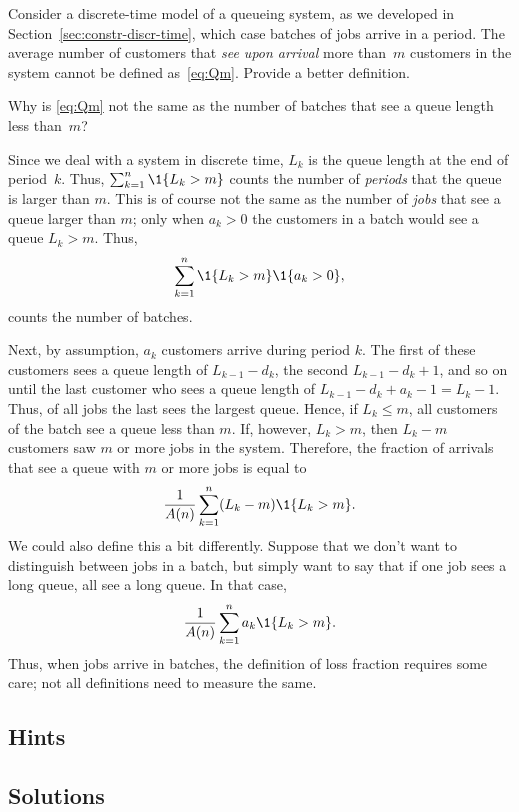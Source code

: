 \begin{exercise}
  Consider a discrete-time model of a queueing system, as we developed
  in Section~\ref{sec:constr-discr-time}, which case  batches of
  jobs arrive in a period.  The average number of customers
  that \emph{see upon arrival} more than~$m$ customers in the system
  cannot be defined as~\eqref{eq:Qm}. Provide a better definition. 
  \begin{hint}
Why is \eqref{eq:Qm} not the same as the number of
  batches that see a queue length less than~$m$?
  \end{hint}
  \begin{solution} Since we deal with a system in discrete time, $L_k$
    is the queue length at the end of period~$k$. Thus,
    $\sum_{k=1}^n \1{L_k > m}$ counts the number of \emph{periods}
    that the queue is larger than $m$. This is of course not the same
    as the number of \emph{jobs} that see a queue larger than $m$;
    only when $a_k>0$ the customers in a batch would see a queue
    $L_k>m$. Thus,
    \begin{equation*}
      \sum_{k=1}^n \1{L_k > m} \1{a_k > 0},
    \end{equation*}
    counts the number of batches. 

    Next, by assumption, $a_k$ customers arrive during period $k$. The
    first of these customers sees a queue length of $L_{k-1} - d_k$,
    the second $L_{k-1}-d_k + 1$, and so on until the last customer
    who sees a queue length of $L_{k-1} - d_k + a_k -1 = L_k
    -1$.
    Thus, of all jobs the last sees the largest queue. Hence, if
    $L_k \leq m$, all customers of the batch see a queue less than
    $m$. If, however, $L_k > m$, then $L_k -m$ customers saw $m$ or
    more jobs in the system. Therefore, the fraction of arrivals that
    see a queue with $m$ or more jobs is equal to
\begin{equation*}
  \frac 1 {A(n)} \sum_{k=1}^n (L_k - m) \1{L_k > m} .
\end{equation*}
We could also define this a bit differently. Suppose that we don't
want to distinguish between jobs in a batch, but simply want to say
that if one job sees a long queue, all see a long queue. In that case,
\begin{equation*}
\frac 1{A(n)}\sum_{k=1}^n a_k \1{L_k > m}.
\end{equation*}
Thus, when jobs arrive in batches, the definition of loss fraction
requires some care; not all definitions need to measure the same.
  \end{solution}
\end{exercise}



\subsection*{Hints}

\subsection*{Solutions}

\clearpage
  



